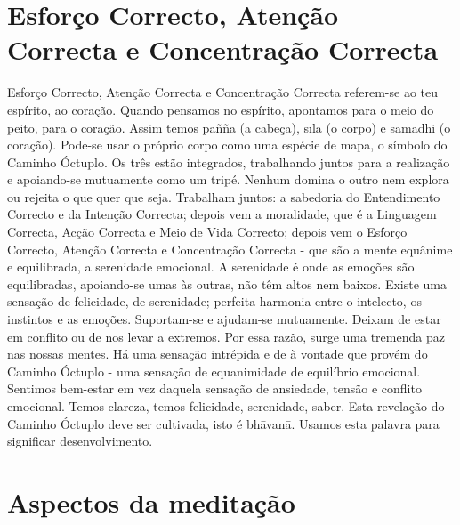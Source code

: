 \section{Esforço Correcto, Atenção Correcta e Concentração Correcta}

Esforço Correcto, Atenção Correcta e Concentração
Correcta referem-se ao teu espírito, ao coração. Quando
pensamos no espírito, apontamos para o meio do peito, para
o coração. Assim temos paññā (a cabeça), sīla (o corpo) e
samādhi (o coração). Pode-se usar o próprio corpo como uma
espécie de mapa, o símbolo do Caminho Óctuplo. Os três
estão integrados, trabalhando juntos para a realização e
apoiando-se mutuamente como um tripé. Nenhum domina o
outro nem explora ou rejeita o que quer que seja.
Trabalham juntos: a sabedoria do Entendimento Correcto
e da Intenção Correcta; depois vem a moralidade, que é a
Linguagem Correcta, Acção Correcta e Meio de Vida
Correcto; depois vem o Esforço Correcto, Atenção Correcta e
Concentração Correcta - que são a mente equânime e equilibrada, a serenidade emocional. A serenidade é onde as
emoções são equilibradas, apoiando-se umas às outras, não
têm altos nem baixos. Existe uma sensação de felicidade, de
serenidade; perfeita harmonia entre o intelecto, os instintos e
as emoções. Suportam-se e ajudam-se mutuamente. Deixam
de estar em conflito ou de nos levar a extremos. Por essa
razão, surge uma tremenda paz nas nossas mentes. Há uma
sensação intrépida e de à vontade que provém do Caminho
Óctuplo - uma sensação de equanimidade de equilíbrio
emocional. Sentimos bem-estar em vez daquela sensação de
ansiedade, tensão e conflito emocional. Temos clareza, temos
felicidade, serenidade, saber. Esta revelação do Caminho
Óctuplo deve ser cultivada, isto é bhāvanā. Usamos esta
palavra para significar desenvolvimento.

\section{Aspectos da meditação}

